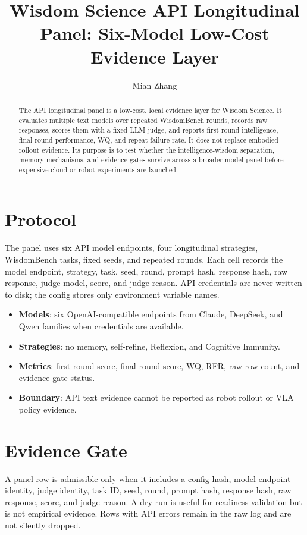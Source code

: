 \documentclass[11pt]{article}
\title{Wisdom Science API Longitudinal Panel: Six-Model Low-Cost Evidence Layer}
\author{Mian Zhang}
\date{}
\begin{document}
\maketitle

\begin{abstract}
The API longitudinal panel is a low-cost, local evidence layer for Wisdom Science.
It evaluates multiple text models over repeated WisdomBench rounds, records raw responses, scores them with a fixed LLM judge, and reports first-round intelligence, final-round performance, WQ, and repeat failure rate.
It does not replace embodied rollout evidence.
Its purpose is to test whether the intelligence-wisdom separation, memory mechanisms, and evidence gates survive across a broader model panel before expensive cloud or robot experiments are launched.
\end{abstract}

\section{Protocol}

The panel uses six API model endpoints, four longitudinal strategies, WisdomBench tasks, fixed seeds, and repeated rounds.
Each cell records the model endpoint, strategy, task, seed, round, prompt hash, response hash, raw response, judge model, score, and judge reason.
API credentials are never written to disk; the config stores only environment variable names.

\begin{itemize}[leftmargin=*]
  \item \textbf{Models}: six OpenAI-compatible endpoints from Claude, DeepSeek, and Qwen families when credentials are available.
  \item \textbf{Strategies}: no memory, self-refine, Reflexion, and Cognitive Immunity.
  \item \textbf{Metrics}: first-round score, final-round score, WQ, RFR, raw row count, and evidence-gate status.
  \item \textbf{Boundary}: API text evidence cannot be reported as robot rollout or VLA policy evidence.
\end{itemize}

\section{Evidence Gate}

A panel row is admissible only when it includes a config hash, model endpoint identity, judge identity, task ID, seed, round, prompt hash, response hash, raw response, score, and judge reason.
A dry run is useful for readiness validation but is not empirical evidence.
Rows with API errors remain in the raw log and are not silently dropped.
\end{document}
